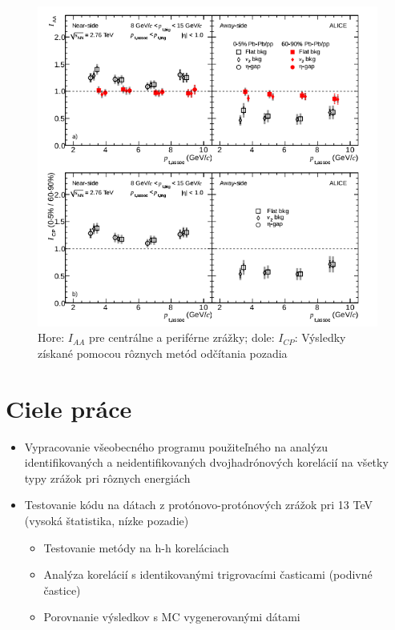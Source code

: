 \documentclass[thesismargins, thesislinespacing]{rnthesis}
\begin{document}
\begin{figure}[hbtp!]
	\centering
	\includegraphics[scale=0.8]{./Obrazky_praca/clanok2.png}
	\caption{ Hore: $I_{AA}$ pre centrálne a periférne zrážky; dole: $I_{CP}$: Výsledky získané pomocou rôznych metód odčítania pozadia~\cite{clanok}}
	\label{clanok2}
\end{figure}



\chapter{Ciele práce} 
\begin{itemize}
	\item Vypracovanie všeobecného programu použiteľného na analýzu identifikovaných a neidentifikovaných dvojhadrónových korelácií na všetky typy zrážok pri rôznych energiách
	\item Testovanie kódu na dátach z protónovo-protónových zrážok pri 13 TeV (vysoká štatistika, nízke pozadie)
	\begin{itemize}
		\item Testovanie metódy na h-h koreláciach
		\item Analýza korelácií s identikovanými trigrovacími časticami (podivné častice)
		\item Porovnanie výsledkov s MC vygenerovanými dátami 
	\end{itemize}
\end{itemize}
\end{document}
